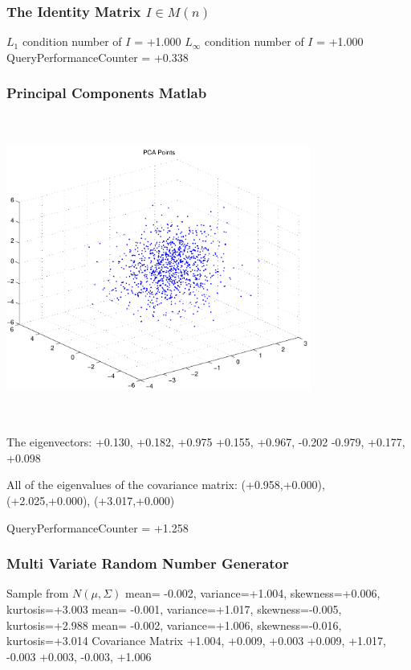 \documentclass[9pt]{article}
\theoremstyle{plain}
\theoremstyle{definition}
\theoremstyle{remark}
\numberwithin{equation}{section}
\begin{document}
\subsubsection{The Identity Matrix $I \in M(n)$}
$L_1$ condition number of $I$ = +1.000
$L_\infty$ condition number of $I$ = +1.000
QueryPerformanceCounter  =  +0.338
\subsubsection{Principal Components Matlab }
\includegraphics[width=10.0cm,height=10.0cm]{PCAPoints.pdf}

The eigenvectors:
+0.130, +0.182, +0.975
+0.155, +0.967, -0.202
-0.979, +0.177, +0.098

All of the eigenvalues of the covariance matrix:
(+0.958,+0.000), (+2.025,+0.000), (+3.017,+0.000)

QueryPerformanceCounter  =  +1.258
\subsubsection{Multi Variate Random Number Generator }
Sample from $N(\mu,\Sigma)$
mean= -0.002, variance=+1.004, skewness=+0.006, kurtosis=+3.003
mean= -0.001, variance=+1.017, skewness=-0.005, kurtosis=+2.988
mean= -0.002, variance=+1.006, skewness=-0.016, kurtosis=+3.014
Covariance Matrix 
+1.004, +0.009, +0.003
+0.009, +1.017, -0.003
+0.003, -0.003, +1.006
\end{document}
